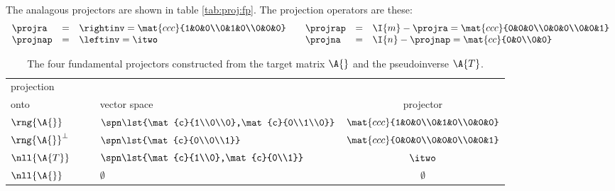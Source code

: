 The analagous projectors are shown in table \eqref{tab:proj:fp}. The projection operators are these:
\begin{equation}
  \begin{array}{lcllcl}
    \projra& = &\rightinv = \mat{ccc}{1&0&0\\0&1&0\\0&0&0} & \quad \projrap& = &\I{m}-\projra = \mat{ccc}{0&0&0\\0&0&0\\0&0&1}\\
    \projnap& =& \leftinv = \itwo & \quad \projna& = &\I{n}-\projnap = \mat{cc}{0&0\\0&0}\\    
  \end{array}
  \label{eq:primitives}
\end{equation}
\begin{table}[htdp]
\begin{center}
\begin{tabular}{llc}
 projection \\
 onto & \qquad vector space & projector\\\hline
 $\rng{\A{}}$  & $\spn\lst{\mat{c}{1\\0\\0},\mat{c}{0\\1\\0}}$ \qquad & $\mat{ccc}{1&0&0\\0&1&0\\0&0&0}$\\[19pt]\hline
 $\rng{\A{}}^{\perp}$ & $\spn\lst{\mat{c}{0\\0\\1}}$ & $\mat{ccc}{0&0&0\\0&0&0\\0&0&1}$ \\[19pt]\hline
 $\nll{\A{T}}\qquad $ & $\spn\lst{\mat{c}{1\\0},\mat{c}{0\\1}}$ & $\itwo$\\[13pt]\hline
 $\nll{\A{}}$  & \qquad \qquad  $\emptyset$ & $\emptyset$\\[2pt]\hline
\end{tabular}
\end{center}
\label{tab:proj:fp}
\caption{The four fundamental projectors constructed from the target matrix $\A{}$ and the pseudoinverse $\A{T}$.}
\end{table}%


